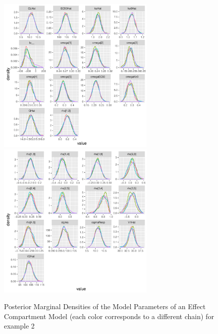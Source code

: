 \documentclass[11pt]{amsart}
\begin{document}
\begin{figure}[!htb]
\includegraphics[width=3.0in,trim=0in 0in 0 0in]{graphics/effCptModelTorsten/effCptModelTorstenPlots006.pdf}
\includegraphics[width=3.0in,trim=0in 0in 0 0in]{graphics/effCptModelTorsten/effCptModelTorstenPlots007.pdf}
\caption{{Posterior Marginal Densities of the Model Parameters of an Effect Compartment Model (each color corresponds to a different chain) for example 2}}
\label{effCptModelDens}
\end{figure}
\end{document}
